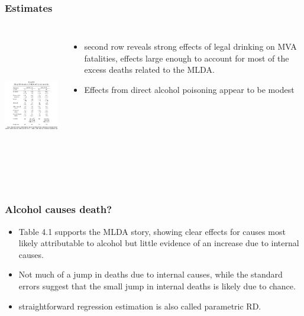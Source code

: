 \documentclass{beamer}
\begin{document}
\begin{frame}
\frametitle{Estimates}
\begin{columns}
\includegraphics[width=6cm,height=6.5cm,keepaspectratio]{Table 4.1} 

\begin{itemize}
	\item second row reveals strong effects of legal drinking on MVA fatalities, effects large enough to account for most of the excess deaths related to the MLDA.
	\item Effects from direct alcohol poisoning appear to be modest
\end{itemize}
\end{columns}	

\end{frame}


\begin{frame}
\frametitle{Alcohol causes death?}
\newline 
\begin{itemize}
	\item Table 4.1 supports the MLDA story, showing clear effects for causes most likely attributable to alcohol but little evidence of an increase due to internal causes.
	\item Not much of a jump in deaths due to internal causes, while the standard errors suggest that the small jump in internal deaths is likely due to chance.
	\item straightforward regression estimation is also called parametric RD.

\end{itemize}

\end{frame}
\end{document}

